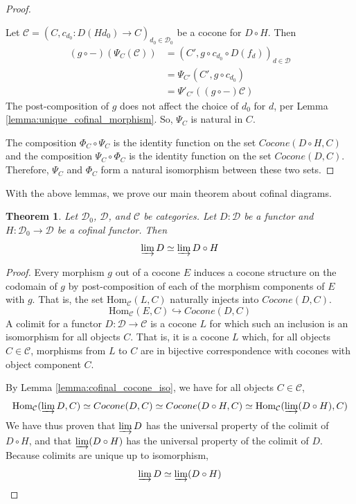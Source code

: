 \documentclass{msthesis}
\newtheorem{theorem}{Theorem}[section]
\theoremstyle{definition}
\newcommand{\mcC}{\mathcal{C}}
\newcommand{\mcD}{\mathcal{D}}
\newcommand{\mcDo}{\mathcal{D}_0}
\newcommand{\Hom}{\mathrm{Hom}}
\begin{document}
\begin{proof}
\begin{description}
        \newcommand{\ccone}{\mathscr{C}}

        Let $\ccone = (C, c_{d_0} : D(H d_0) \to C)_{d_0 \in \mcDo}$ be a cocone for $D \circ H$.
        Then 
        \begin{align*}
        (g \circ {-}) (\Psi_C(\ccone))
        &= (C',g \circ c_{d_0} \circ D(f_d))_{d\in \mcD}\\
        &= \Psi_{C'}(C',g \circ c_{d_0})\\
        &= \Psi'_{C'}((g \circ {-}) \ccone)
        \end{align*}
        The post-composition of $g$ does not affect the choice of $d_0$ for $d$, per Lemma \ref{lemma:unique_cofinal_morphism}.  So, $\Psi_C$ is natural in $C$.
    \end{description}

    The composition $\Phi_C \circ \Psi_C$ is the identity function on the set $Cocone(D \circ H, C)$ and the composition $\Psi_C \circ \Phi_C$ is the identity function on the set $Cocone(D,  C)$.  Therefore, $\Psi_C$ and $\Phi_C$ form a natural isomorphism between these two sets.
\end{proof}

With the above lemmas, we prove our main theorem about cofinal diagrams.

\begin{theorem}\label{theorem:cofinal}
    Let $\mcDo$, $\mcD$, and $\mcC$ be categories.  Let $D : \mcD$ be a functor and $H : \mcDo \to \mcD$ be a cofinal functor.  Then
    \[ \varinjlim D \simeq \varinjlim D \circ H \]
\end{theorem}
\begin{proof}
    Every morphism $g$ out of a cocone $E$ induces a cocone structure on the codomain of $g$ by post-composition of each of the morphism components of $E$ with $g$.  That is, the set $\Hom_\mcC(L, C)$ naturally injects into $Cocone(D, C)$.
    \[ \Hom_\mcC(E, C) \hookrightarrow Cocone(D, C) \]
    A colimit for a functor $D : \mcD \to \mcC$ is a cocone $L$ for which such an inclusion is an isomorphism for all objects $C$.  That is, it is a cocone $L$ which, for all objects $C \in \mcC$, morphisms from $L$ to $C$ are in bijective correspondence with cocones with object component $C$.
    
    By Lemma \ref{lemma:cofinal_cocone_iso}, we have for all objects $C \in \mcC$,
    \[ \Hom_\mcC(\varinjlim D, C) \simeq Cocone(D, C) \simeq Cocone(D \circ H, C) \simeq \Hom_\mcC(\varinjlim (D \circ H), C)\]
    We have thus proven that $\varinjlim D$ has the universal property of the colimit of $D \circ H$, and that $\varinjlim(D \circ H)$ has the universal property of the colimit of $D$.  Because colimits are unique up to isomorphism,
    \[ \varinjlim D \simeq \varinjlim(D \circ H) \qedhere \]
\end{proof}
\end{document}
